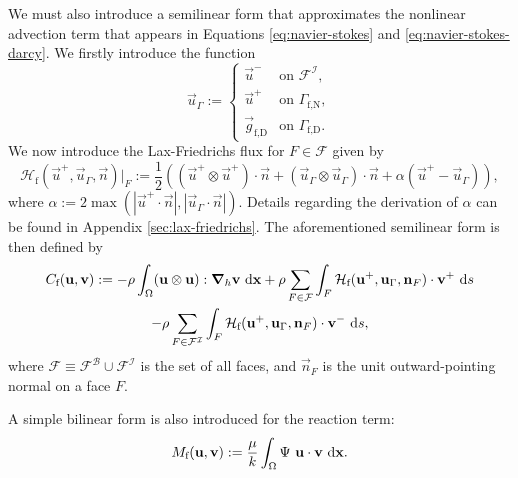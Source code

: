             We must also introduce a semilinear form that approximates the nonlinear advection term that appears in Equations \eqref{eq:navier-stokes} and \eqref{eq:navier-stokes-darcy}. We firstly introduce the function
            \begin{equation}
                \vec{u}_\Gamma := 
                \begin{cases}
                    \vec{u}^- & \text{on~} \mathcal{F}^\mathcal{I}, \\
                    \vec{u}^+ & \text{on~} \Gamma_\text{f,N}, \\
                    \vec{g}_\text{f,D} & \text{on~} \Gamma_\text{f,D}.
                \end{cases}
                \label{eq:u_gamma}
            \end{equation}
            We now introduce the Lax-Friedrichs flux for $F \in \mathcal{F}$ given by
            \begin{equation}
                \mathcal{H}_\text{f}(\vec{u}^+, \vec{u}_\Gamma, \vec{n})|_F := \frac{1}{2} ((\vec{u}^+ \otimes \vec{u}^+) \cdot \vec{n} + (\vec{u}_\Gamma \otimes \vec{u}_\Gamma) \cdot \vec{n} + \alpha(\vec{u}^+ - \vec{u}_\Gamma)),
                \label{eq:lax-friedrichs}
            \end{equation}
            where $\alpha := 2\max(|\vec{u}^+\cdot\vec{n}|, |\vec{u}_\Gamma\cdot\vec{n}|)$. Details regarding the derivation of $\alpha$ can be found in Appendix \ref{sec:lax-friedrichs}. The aforementioned semilinear form is then defined by
            \begin{multline}
                C_\text{f}(\boldsymbol{\mathbf{u}}, \boldsymbol{\mathbf{v}}) := - \rho \int_{\Omega} (\boldsymbol{\mathbf{u}} \otimes \boldsymbol{\mathbf{u}}) : \boldsymbol{\mathbf{\nabla}}_h \boldsymbol{\mathbf{v}} ~\mathrm{d} \boldsymbol{\mathbf{x}} + \rho \sum_{F \in \mathcal{F}} \int_{F} \mathcal{H}_\text{f}(\boldsymbol{\mathbf{u}}^+, \boldsymbol{\mathbf{u}}_\Gamma, \boldsymbol{\mathbf{n}}_F) \cdot \boldsymbol{\mathbf{v}}^+ ~\mathrm{d} s \\ - \rho \sum_{F \in \mathcal{F}^\mathcal{I}} \int_{F} \mathcal{H}_\text{f}(\boldsymbol{\mathbf{u}}^+, \boldsymbol{\mathbf{u}}_\Gamma, \boldsymbol{\mathbf{n}}_F) \cdot \boldsymbol{\mathbf{v}}^- ~\mathrm{d} s,
                \label{eq:nsb-wf-advection}
            \end{multline}
            where $\mathcal{F} \equiv \mathcal{F}^\mathcal{B} \cup \mathcal{F}^\mathcal{I}$ is the set of all faces, and $\vec{n}_F$ is the unit outward-pointing normal on a face $F$.
    
            A simple bilinear form is also introduced for the reaction term:
            \begin{equation}
                M_\text{f}(\boldsymbol{\mathbf{u}}, \boldsymbol{\mathbf{v}}) := \frac{\mu}{k} \int_\Omega \Psi ~ \boldsymbol{\mathbf{u}} \cdot \boldsymbol{\mathbf{v}} ~\mathrm{d} \boldsymbol{\mathbf{x}}.
            \end{equation}
    
